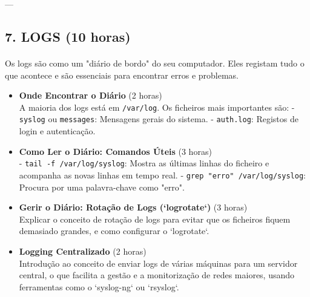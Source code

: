 \documentclass[10pt,a4paper]{article}
\begin{document}
	---
	
	\subsection*{7. LOGS (10 horas)}
	\vspace{-1.2em}
	\paragraph{}
	Os logs são como um "diário de bordo" do seu computador. Eles registam tudo o que acontece e são essenciais para encontrar erros e problemas.
	
	\begin{itemize}
		\item \textbf{Onde Encontrar o Diário} (2 horas) \\
		A maioria dos logs está em \texttt{/var/log}. Os ficheiros mais importantes são:
		- \texttt{syslog} ou \texttt{messages}: Mensagens gerais do sistema.
		- \texttt{auth.log}: Registos de login e autenticação.
		
		\item \textbf{Como Ler o Diário: Comandos Úteis} (3 horas) \\
		- \texttt{tail -f /var/log/syslog}: Mostra as últimas linhas do ficheiro e acompanha as novas linhas em tempo real.
		- \texttt{grep "erro" /var/log/syslog}: Procura por uma palavra-chave como "erro".
		
		\item \textbf{Gerir o Diário: Rotação de Logs (`logrotate`)} (3 horas) \\
		Explicar o conceito de rotação de logs para evitar que os ficheiros fiquem demasiado grandes, e como configurar o `logrotate`.
		
		\item \textbf{Logging Centralizado} (2 horas) \\
		Introdução ao conceito de enviar logs de várias máquinas para um servidor central, o que facilita a gestão e a monitorização de redes maiores, usando ferramentas como o `syslog-ng` ou `rsyslog`.
		
	\end{itemize}
	
\end{document}
